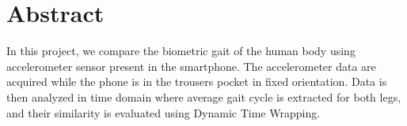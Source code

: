\newpage
\chapter*{\centering Abstract}
{

In this project, we compare the biometric gait of the human body using accelerometer sensor present in the smartphone.\newline\newline
The accelerometer data are acquired while the phone is in the trousers pocket in fixed orientation.\newline\newline
Data is then analyzed in time domain where average gait cycle is extracted for both legs, and their similarity is evaluated using Dynamic Time Wrapping.
}

 

